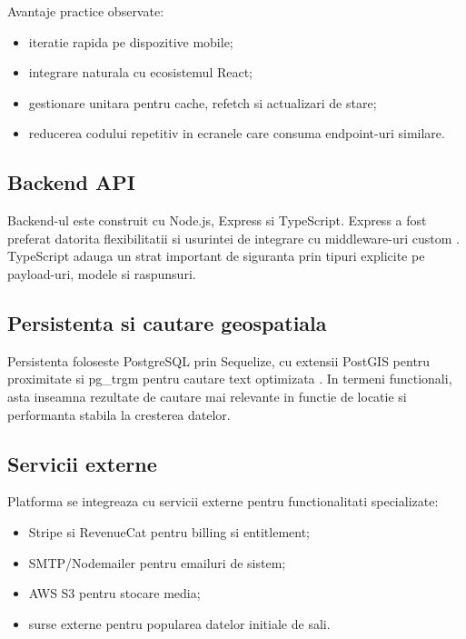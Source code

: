 Avantaje practice observate:
\begin{itemize}[leftmargin=1.2cm]
    \item iteratie rapida pe dispozitive mobile;
    \item integrare naturala cu ecosistemul React;
    \item gestionare unitara pentru cache, refetch si actualizari de stare;
    \item reducerea codului repetitiv in ecranele care consuma endpoint-uri similare.
\end{itemize}

\subsection{Backend API}

Backend-ul este construit cu Node.js, Express si TypeScript. Express a fost preferat datorita flexibilitatii si usurintei de integrare cu middleware-uri custom \parencite{expressdocs}. TypeScript adauga un strat important de siguranta prin tipuri explicite pe payload-uri, modele si raspunsuri.

\subsection{Persistenta si cautare geospatiala}

Persistenta foloseste PostgreSQL prin Sequelize, cu extensii PostGIS pentru proximitate si pg\_trgm pentru cautare text optimizata \parencite{postgresdocs,postgisdocs}. In termeni functionali, asta inseamna rezultate de cautare mai relevante in functie de locatie si performanta stabila la cresterea datelor.

\subsection{Servicii externe}

Platforma se integreaza cu servicii externe pentru functionalitati specializate:
\begin{itemize}[leftmargin=1.2cm]
    \item Stripe si RevenueCat pentru billing si entitlement;
    \item SMTP/Nodemailer pentru emailuri de sistem;
    \item AWS S3 pentru stocare media;
    \item surse externe pentru popularea datelor initiale de sali.
\end{itemize}


